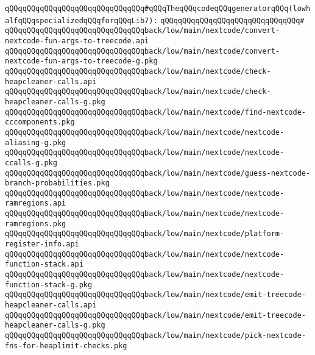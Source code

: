 \newline
\newline
\verb|qQQqqQQqqQQqqQQqqQQqqQQqqQQqqQQq#qQQqTheqQQqcodeqQQqgeneratorqQQq(lowhalfqQQqspecializedqQQqforqQQqLib7):|\newline
\verb|qQQqqQQqqQQqqQQqqQQqqQQqqQQqqQQq#|\newline
\verb|qQQqqQQqqQQqqQQqqQQqqQQqqQQqqQQqback/low/main/nextcode/convert-nextcode-fun-args-to-treecode.api|\newline
\verb|qQQqqQQqqQQqqQQqqQQqqQQqqQQqqQQqback/low/main/nextcode/convert-nextcode-fun-args-to-treecode-g.pkg|\newline
\verb|qQQqqQQqqQQqqQQqqQQqqQQqqQQqqQQqback/low/main/nextcode/check-heapcleaner-calls.api|\newline
\verb|qQQqqQQqqQQqqQQqqQQqqQQqqQQqqQQqback/low/main/nextcode/check-heapcleaner-calls-g.pkg|\newline
\verb|qQQqqQQqqQQqqQQqqQQqqQQqqQQqqQQqback/low/main/nextcode/find-nextcode-cccomponents.pkg|\newline
\verb|qQQqqQQqqQQqqQQqqQQqqQQqqQQqqQQqback/low/main/nextcode/nextcode-aliasing-g.pkg|\newline
\verb|qQQqqQQqqQQqqQQqqQQqqQQqqQQqqQQqback/low/main/nextcode/nextcode-ccalls-g.pkg|\newline
\verb|qQQqqQQqqQQqqQQqqQQqqQQqqQQqqQQqback/low/main/nextcode/guess-nextcode-branch-probabilities.pkg|\newline
\verb|qQQqqQQqqQQqqQQqqQQqqQQqqQQqqQQqback/low/main/nextcode/nextcode-ramregions.api|\newline
\verb|qQQqqQQqqQQqqQQqqQQqqQQqqQQqqQQqback/low/main/nextcode/nextcode-ramregions.pkg|\newline
\verb|qQQqqQQqqQQqqQQqqQQqqQQqqQQqqQQqback/low/main/nextcode/platform-register-info.api|\newline
\verb|qQQqqQQqqQQqqQQqqQQqqQQqqQQqqQQqback/low/main/nextcode/nextcode-function-stack.api|\newline
\verb|qQQqqQQqqQQqqQQqqQQqqQQqqQQqqQQqback/low/main/nextcode/nextcode-function-stack-g.pkg|\newline
\verb|qQQqqQQqqQQqqQQqqQQqqQQqqQQqqQQqback/low/main/nextcode/emit-treecode-heapcleaner-calls.api|\newline
\verb|qQQqqQQqqQQqqQQqqQQqqQQqqQQqqQQqback/low/main/nextcode/emit-treecode-heapcleaner-calls-g.pkg|\newline
\verb|qQQqqQQqqQQqqQQqqQQqqQQqqQQqqQQqback/low/main/nextcode/pick-nextcode-fns-for-heaplimit-checks.pkg|\newline

